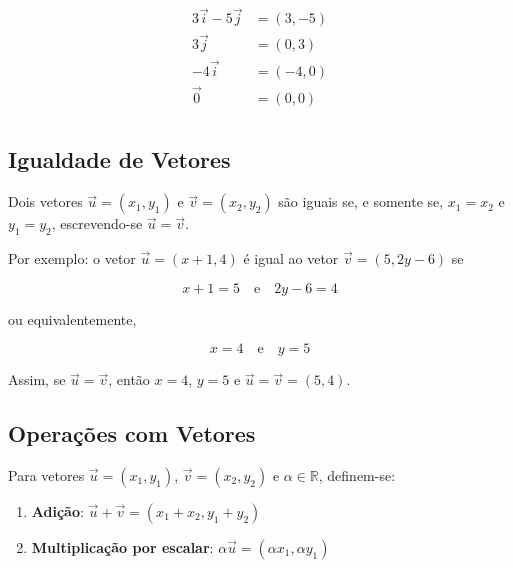 \begin{align*}
  3\vec{i} - 5\vec{j} &= (3, -5) \\
  3\vec{j} &= (0, 3) \\
  -4\vec{i} &= (-4, 0) \\
  \vec{0} &= (0, 0) \\
\end{align*}

\subsection{Igualdade de Vetores}

Dois vetores $\vec{u} = (x_1, y_1)$ e $\vec{v} = (x_2, y_2)$ são iguais se, e
somente se, $x_1 = x_2$ e $y_1 = y_2$, escrevendo-se $\vec{u} = \vec{v}$.

Por exemplo: o vetor $\vec{u} = (x + 1, 4)$ é igual ao vetor $\vec{v} = (5, 2y -
6)$ se

\[
x + 1 = 5 \quad \text{e} \quad 2y - 6 = 4
\] 

ou equivalentemente,

\[
x = 4 \quad \text{e} \quad y = 5
\] 

Assim, se $\vec{u} = \vec{v}$, então $x = 4$, $y = 5$ e $\vec{u} = \vec{v} = (5,
4)$.

\newpage
\subsection{Operações com Vetores}

Para vetores $\vec{u} = (x_1,y_1)$, $\vec{v} = (x_2,y_2)$ e $\alpha \in
\mathbb{R}$, definem-se:

\begin{enumerate}
  \item \textbf{Adição}: $\vec{u}+\vec{v}=(x_1+x_2,y_1+y_2)$
  \item \textbf{Multiplicação por escalar}: $\alpha\vec{u}=(\alpha x_1,\alpha y_1)$
\end{enumerate}

